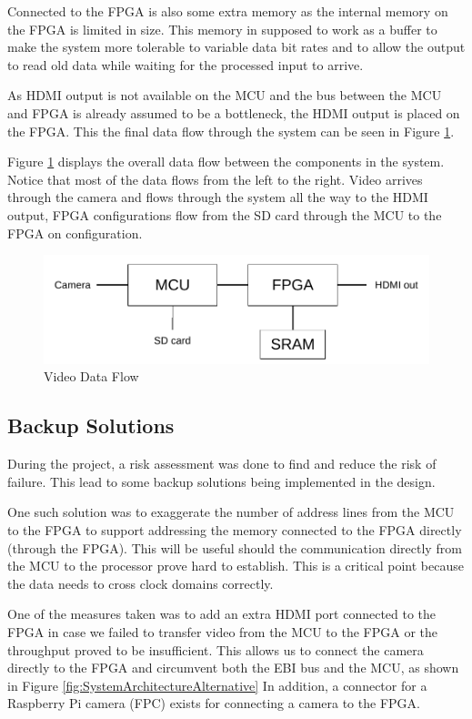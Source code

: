 Connected to the FPGA is also some extra memory as the internal memory on the FPGA is limited in size.
This memory in supposed to work as a buffer to make the system more tolerable to variable data bit rates and to allow the output to read old data while waiting for the processed input to arrive.

As HDMI output is not available on the MCU and the bus between the MCU and FPGA is already assumed to be a bottleneck, the HDMI output is placed on the FPGA.
This the final data flow through the system can be seen in Figure \ref{fig:SystemArchitecture}.

Figure \ref{fig:SystemArchitecture} displays the overall data flow between the components in the system.
Notice that most of the data flows from the left to the right. Video arrives through the camera and flows through the system all the way to the HDMI output, FPGA configurations flow from the SD card through the MCU to the FPGA on configuration.

\begin{figure}
    \includegraphics{img/SystemArchitecture}
    \caption{Video Data Flow}
    \label{fig:SystemArchitecture}
\end{figure}

\subsection{Backup Solutions} \label{subsec:RiskAssessment}
During the project, a risk assessment was done to find and reduce the risk of failure.
This lead to some backup solutions being implemented in the design.

One such solution was to exaggerate the number of address lines from the MCU to the FPGA to support addressing the memory connected to the FPGA directly (through the FPGA).
This will be useful should the communication directly from the MCU to the processor prove hard to establish.
This is a critical point because the data needs to cross clock domains correctly.

One of the measures taken was to add an extra HDMI port connected to the FPGA in case we failed to transfer video from the MCU to the FPGA or the throughput proved to be insufficient.
This allows us to connect the camera directly to the FPGA and circumvent both the EBI bus and the MCU, as shown in Figure \ref{fig:SystemArchitectureAlternative}
In addition, a connector for a Raspberry Pi camera (FPC) exists for connecting a camera to the FPGA.

